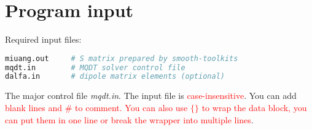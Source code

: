 \documentclass[11pt]{article}
\begin{document}
\section{\label{sec:input}Program input}
Required input files:
\begin{lstlisting}[language=bash]
miuang.out     # S matrix prepared by smooth-toolkits
mqdt.in        # MQDT solver control file                             
dalfa.in       # dipole matrix elements (optional) 
\end{lstlisting}

The major control file \emph{mqdt.in}. The input file is \textcolor{red}{case-insensitive}. You can add  \textcolor{red}{blank lines and $\#$ to comment. You can also use $\{\}$ to wrap the data block, you can put them in one line or break the wrapper into multiple lines}.
\end{document}
